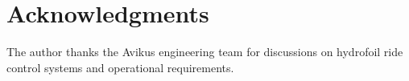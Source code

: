 \documentclass[review]{elsarticle}
\begin{document}
\section*{Acknowledgments}

The author thanks the Avikus engineering team for discussions on
hydrofoil ride control systems and operational requirements.



\end{document}
